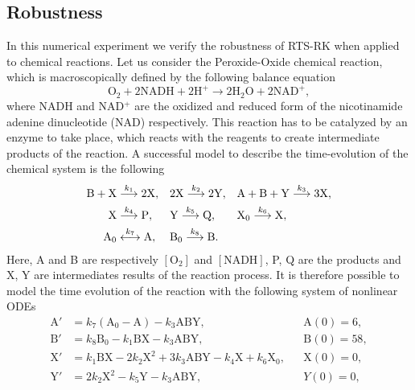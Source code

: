 \documentclass[10pt]{article}
\begin{document}
\subsection{Robustness} In this numerical experiment we verify the robustness of RTS-RK when applied to chemical reactions. Let us consider the Peroxide-Oxide chemical reaction, which is macroscopically defined by the following balance equation
\begin{equation}
	\mathrm{O}_2 + 2\mathrm{NADH} + 2\mathrm{H}^+ \to 2\mathrm{H}_2\mathrm{O} + 2\mathrm{NAD}^+,
\end{equation}
where NADH and NAD$^+$ are the oxidized and reduced form of the nicotinamide adenine dinucleotide (NAD) respectively. This reaction has to be catalyzed by an enzyme to take place, which reacts with the reagents to create intermediate products of the reaction. A successful model \cite{Ols83} to describe the time-evolution of the chemical system is the following
\begin{equation}
\begin{aligned}
	\mathrm{B} + \mathrm{X} &\stackrel{k_1}{\longrightarrow} 2 \mathrm{X}, 
	&&2\mathrm{X} \stackrel{k_2}{\longrightarrow} 2\mathrm{Y}, 
	&&\mathrm{A} + \mathrm{B} + \mathrm{Y} \stackrel{k_3}{\longrightarrow} 3 \mathrm{X}, \\
	\mathrm{X} &\stackrel{k_4}{\longrightarrow} \mathrm{P}, 
	&&\mathrm{Y} \stackrel{k_5}{\longrightarrow} \mathrm{Q}, 
	&&\mathrm{X_0} \stackrel{k_6}{\longrightarrow} \mathrm{X}, \\
	\mathrm{A_0} &\stackrel{k_7}{\longleftrightarrow} \mathrm{A}, 
	&&\mathrm{B_0} \stackrel{k_8}{\longrightarrow} \mathrm{B}.
\end{aligned}
\end{equation}
Here, A and B are respectively $[\mathrm{O}_2]$ and $[\mathrm{NADH}]$, P, Q are the products and X, Y are intermediates results of the reaction process. It is therefore possible to model the time evolution of the reaction with the following system of nonlinear ODEs 
\begin{equation}\label{eq:PeroxOx}
\begin{aligned}
	\mathrm{A}' &= k_7  (\mathrm{A}_0 - \mathrm{A}) - k_3  \mathrm{A}\mathrm{B}\mathrm{Y}, &&\mathrm{A}(0) = 6, \\
	\mathrm{B}' &= k_8\mathrm{B}_0 - k_1  \mathrm{B}\mathrm{X} - k_3  \mathrm{A}\mathrm{B}\mathrm{Y}, &&\mathrm{B}(0) = 58, \\
	\mathrm{X}' &= k_1  \mathrm{B}\mathrm{X} - 2  k_2  \mathrm{X}^2 + 3  k_3 \mathrm{A}\mathrm{B}\mathrm{Y} - k_4  \mathrm{X} + k_6\mathrm{X}_0,&& \mathrm{X}(0) = 0, \\
	\mathrm{Y}' &= 2  k_2  \mathrm{X}^2 - k_5  \mathrm{Y} - k_3  \mathrm{A}\mathrm{B}\mathrm{Y}, && Y(0) = 0,
\end{aligned}
\end{equation}
\end{document}
